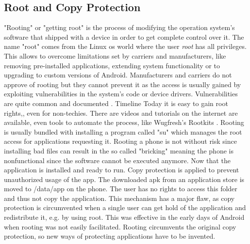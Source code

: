\subsection{Root and Copy Protection} \label{subsection:android-copyroot}
"Rooting" or "getting root" is the process of modifying the operation system's software that shipped with a device in order to get complete control over it.
The name "root" comes from the Linux \gls{os} world where the user \textit{root} has all privileges.
This allows to overcome limitations set by carriers and manufacturers, like removing pre-installed applications, extending system functionality or to upgrading to custom versions of Android.
Manufacturers and carriers do not approve of rooting but they cannot prevent it as the access is usually gained by exploiting vulnerabilities in the system's code or device drivers.
Vulnerabilities are quite common and documented \cite{androidVulnerabilities}.
\cite{asdasd}
Timeline
\cite{asdasd}
Today it is easy to gain root rights,, even for non-techies.
There are videos and tutorials on the internet  are available, even tools to automate the process, like Wugfresh's Rootkits \cite{wugfresh}.
Rooting is usually bundled with installing a program called "su" which manages the root access for applications requesting it.
Rooting a phone is not without risk since installing bad files can result in the so called "bricking" meaning the phone is nonfunctional since the software cannot be executed anymore.\cite{androidpoliceRoot}
\newline
Now that the application is installed and ready to run.
Copy protection is applied to prevent unauthorized usage of the app.
The downloaded \gls{apk} from an application store is moved to /data/app on the phone.
The user has no rights to access this folder and thus not copy the application.
This mechanism has a major flaw, as copy protection is circumvented when a single user can get hold of the application and redistribute it, e.g. by using root.
This was effective in the early days of Android when rooting was not easily facilitated.
\newline
Rooting circumvents the original copy protection, so new ways of protecting applications have to be invented.

